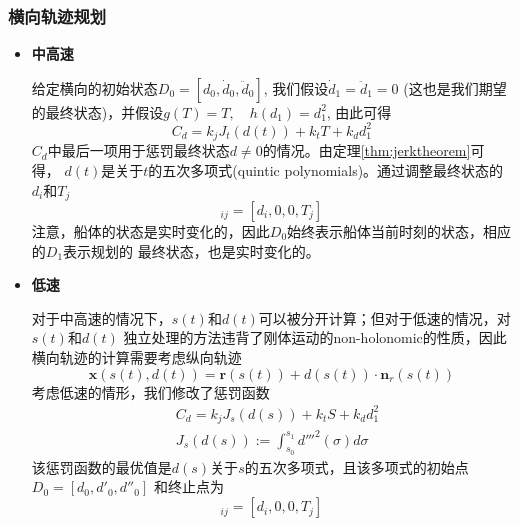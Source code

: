 \subsubsection{横向轨迹规划}
\begin{itemize}
  \item \textbf{中高速}

  给定横向的初始状态$D_0=[d_0, \dot{d}_0, \ddot{d}_0]$, 我们假设$\dot{d}_1=\ddot{d}_1=0$
  (这也是我们期望的最终状态)，并假设$g(T)=T, \quad h(d_1)=d_1^2$, 由此可得
  \begin{equation}
    C_d = k_j J_t(d(t))+k_t T + k_d d_1^2
  \end{equation}
  $C_d$中最后一项用于惩罚最终状态$d \neq 0$的情况。由定理\ref{thm:jerktheorem}可得，
  $d(t)$是关于$t$的五次多项式(quintic polynomials)。通过调整最终状态的$d_i$和$T_j$
  \begin{equation}
    [d_1,\dot{d}_1,\ddot{d}_1,T]_{ij}=[d_i,0,0,T_j]
  \end{equation}
  注意，船体的状态是实时变化的，因此$D_0$始终表示船体当前时刻的状态，相应的$D_1$表示规划的
  最终状态，也是实时变化的。

  \item \textbf{低速}

  对于中高速的情况下，$s(t)$和$d(t)$可以被分开计算；但对于低速的情况，对$s(t)$和$d(t)$
  独立处理的方法违背了刚体运动的non-holonomic的性质，因此横向轨迹的计算需要考虑纵向轨迹
  \begin{equation}
    \bm{x}(s(t),d(t)) = \bm{r}(s(t)) + d(s(t)) \cdot \bm{n}_r(s(t))
  \end{equation}
  考虑低速的情形，我们修改了惩罚函数
  \begin{equation}
    \begin{aligned}
      &C_d = k_j J_s(d(s)) + k_t S + k_d d_1^2 \\
      &J_s(d(s)):= \int_{s_0}^{s_1} d'''^2(\sigma) d \sigma
    \end{aligned}
  \end{equation}
  该惩罚函数的最优值是$d(s)$关于$s$的五次多项式，且该多项式的初始点$D_0=[d_0, d'_0, d''_0]$
  和终止点为
  \begin{equation}
    [d_1, d'_1,d''_1, T]_{ij}=[d_i, 0, 0, T_j]
  \end{equation}
\end{itemize}

